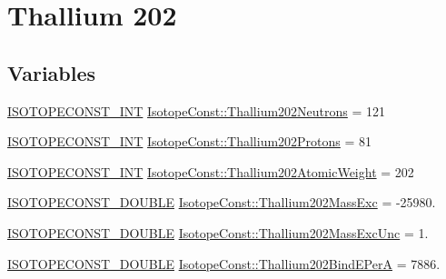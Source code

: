 \hypertarget{group___isotope_const-_thallium-_tl202}{}\section{Thallium 202}
\label{group___isotope_const-_thallium-_tl202}
\subsection*{Variables}
\begin{DoxyCompactItemize}
\item 
\mbox{\hyperlink{group___isotope_const-_macros_ga5f18360b3e99483a35c32d789e62621c}{I\+S\+O\+T\+O\+P\+E\+C\+O\+N\+S\+T\+\_\+\+I\+NT}} \mbox{\hyperlink{group___isotope_const-_thallium-_tl202_ga81ba4c512f4be853233875e1d5cbdd17}{Isotope\+Const\+::\+Thallium202\+Neutrons}} = 121
\item 
\mbox{\hyperlink{group___isotope_const-_macros_ga5f18360b3e99483a35c32d789e62621c}{I\+S\+O\+T\+O\+P\+E\+C\+O\+N\+S\+T\+\_\+\+I\+NT}} \mbox{\hyperlink{group___isotope_const-_thallium-_tl202_ga28978214e2c386867cb110b2ebdc0999}{Isotope\+Const\+::\+Thallium202\+Protons}} = 81
\item 
\mbox{\hyperlink{group___isotope_const-_macros_ga5f18360b3e99483a35c32d789e62621c}{I\+S\+O\+T\+O\+P\+E\+C\+O\+N\+S\+T\+\_\+\+I\+NT}} \mbox{\hyperlink{group___isotope_const-_thallium-_tl202_gae0554d9c18c1d2199c994da02e0a274f}{Isotope\+Const\+::\+Thallium202\+Atomic\+Weight}} = 202
\item 
\mbox{\hyperlink{group___isotope_const-_macros_ga8f45a7272ce02c0b4c65c44636ed719a}{I\+S\+O\+T\+O\+P\+E\+C\+O\+N\+S\+T\+\_\+\+D\+O\+U\+B\+LE}} \mbox{\hyperlink{group___isotope_const-_thallium-_tl202_ga21b3ec4d267db36c7884fa94969a034f}{Isotope\+Const\+::\+Thallium202\+Mass\+Exc}} = -\/25980.
\item 
\mbox{\hyperlink{group___isotope_const-_macros_ga8f45a7272ce02c0b4c65c44636ed719a}{I\+S\+O\+T\+O\+P\+E\+C\+O\+N\+S\+T\+\_\+\+D\+O\+U\+B\+LE}} \mbox{\hyperlink{group___isotope_const-_thallium-_tl202_ga4bb87ad98b2e95101c9deb95f1afde51}{Isotope\+Const\+::\+Thallium202\+Mass\+Exc\+Unc}} = 1.
\item 
\mbox{\hyperlink{group___isotope_const-_macros_ga8f45a7272ce02c0b4c65c44636ed719a}{I\+S\+O\+T\+O\+P\+E\+C\+O\+N\+S\+T\+\_\+\+D\+O\+U\+B\+LE}} \mbox{\hyperlink{group___isotope_const-_thallium-_tl202_ga264442442c1b8728f7c60377ebbb92e5}{Isotope\+Const\+::\+Thallium202\+Bind\+E\+PerA}} = 7886.
\item 

\end{DoxyCompactItemize}
